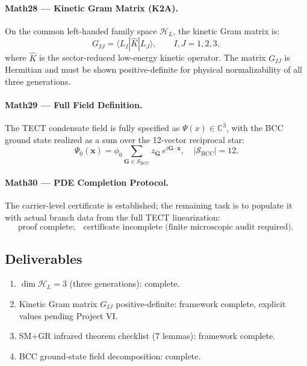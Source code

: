 \documentclass[reprint,aps,pre,onecolumn,superscriptaddress,amsmath,amssymb]{revtex4-2}
\begin{document}
\paragraph{Math28 --- Kinetic Gram Matrix (K2A).}
On the common left-handed family space $\mathcal{H}_{L}$, the kinetic
Gram matrix is:
\begin{equation}
  G_{IJ} = \langle L_{I} | \hat{K} | L_{J} \rangle,
  \qquad I, J = 1, 2, 3,
  \label{eq:Gram}
\end{equation}
where $\hat{K}$ is the sector-reduced low-energy kinetic operator.
The matrix $G_{IJ}$ is Hermitian and must be shown positive-definite for
physical normalizability of all three generations.

\paragraph{Math29 --- Full Field Definition.}
The TECT condensate field is fully specified as
$\Psi(x)\in\mathbb{C}^{3}$, with the BCC ground state realized as a
sum over the 12-vector reciprocal star:
\begin{equation}
  \Psi_{0}(\mathbf{x})
  = \phi_{0} \sum_{\mathbf{G}\in\mathcal{S}_{\mathrm{BCC}}} z_{\mathbf{G}}\,
    e^{i\mathbf{G}\cdot\mathbf{x}},
  \quad
  |\mathcal{S}_{\mathrm{BCC}}| = 12.
  \label{eq:BCC-ground-state}
\end{equation}

\paragraph{Math30 --- PDE Completion Protocol.}
The carrier-level certificate is established; the remaining task is
to populate it with actual branch data from the full TECT linearization:
\begin{equation}
  \boxed{
    \text{proof complete};\quad
    \text{certificate incomplete (finite microscopic audit required).}
  }
  \label{eq:completion-status}
\end{equation}

\subsection{Deliverables}
\begin{enumerate}
  \item $\dim\mathcal{H}_{L} = 3$ (three generations): complete.
  \item Kinetic Gram matrix $G_{IJ}$ positive-definite: framework complete,
        explicit values pending Project VI.
  \item SM$+$GR infrared theorem checklist (7 lemmas): framework complete.
  \item BCC ground-state field decomposition: complete.
\end{enumerate}
\end{document}
